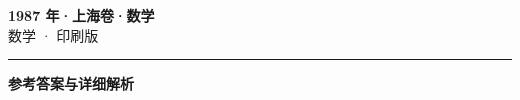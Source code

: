 \documentclass[zihao=5, a4paper]{ctexart}
\begin{document}
\begin{center}
  {\Large\bfseries 1987 年·上海卷·数学}\\[4pt]
  {\large 数学 · 印刷版}
\end{center}
\medskip
{}

\par\bigskip\hrule\bigskip
{}
\begin{center}{\large\bfseries 参考答案与详细解析}\end{center}
\smallskip

\end{document}
